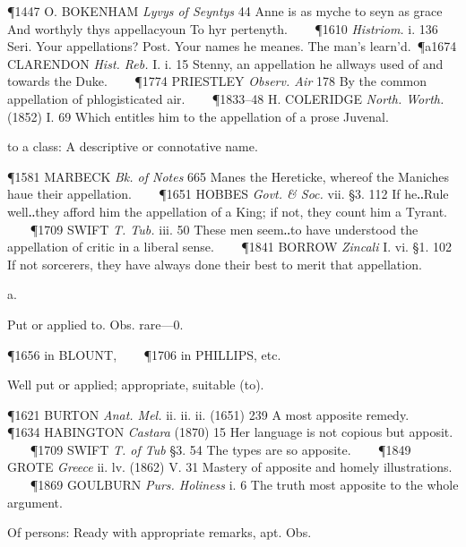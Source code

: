 \begin{description}[wide, labelwidth=!, labelindent=0pt]
\begin{myenumerate}
\P 1447 O. BOKENHAM  \textit{Lyvys of Seyntys} 44 Anne is as myche to seyn as grace And worthyly thys appellacyoun To hyr pertenyth.    
\P 1610 \textit{Histriom.}  i. 136 Seri. Your appellations? Post. Your names he meanes. The man's learn'd. 
\P a1674 CLARENDON  \textit{Hist. Reb.} I. i. 15 Stenny, an appellation he allways used of and towards the Duke.    
\P 1774 PRIESTLEY  \textit{Observ. Air} 178 By the common appellation of phlogisticated air.    
\P 1833–48 H. COLERIDGE \textit{North. Worth.} (1852) I. 69 Which entitles him to the appellation of a prose Juvenal.

 to a class: A descriptive or connotative name.

\P 1581 MARBECK  \textit{Bk. of Notes} 665 Manes the Hereticke, whereof the Maniches haue their appellation.    
\P 1651 HOBBES  \textit{Govt. \& Soc.} vii. §3. 112 If he‥Rule well‥they afford him the appellation of a King; if not, they count him a Tyrant.    
\P 1709 SWIFT  \textit{T. Tub.} iii. 50 These men seem‥to have understood the appellation of critic in a liberal sense.    
\P 1841 BORROW  \textit{Zincali} I. vi. §1. 102 If not sorcerers, they have always done their best to merit that appellation.
\end{myenumerate}


 a.

\noindent {}

\vspace{-0.3cm}

\begin{myenumerate}

 Put or applied to. Obs. rare—0.

\P 1656 in BLOUNT,    
\P 1706 in PHILLIPS, etc.

 Well put or applied; appropriate, suitable (to).

\P 1621 BURTON  \textit{Anat. Mel.} ii. ii. ii. (1651) 239 A most apposite remedy.    
\P 1634 HABINGTON  \textit{Castara} (1870) 15 Her language is not copious but apposit.    
\P 1709 SWIFT  \textit{T. of Tub} §3. 54 The types are so apposite.    
\P 1849 GROTE  \textit{Greece} ii. lv. (1862) V. 31 Mastery of apposite and homely illustrations.    
\P 1869 GOULBURN  \textit{Purs. Holiness} i. 6 The truth most apposite to the whole argument.

 Of persons: Ready with appropriate remarks, apt. Obs.


\end{myenumerate}
\end{description}
